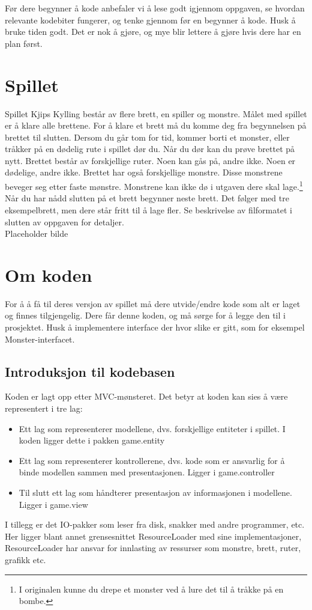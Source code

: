 \documentclass[norsk]{article}
\begin{document}
Før dere begynner å kode anbefaler vi å lese godt igjennom oppgaven, se hvordan relevante kodebiter fungerer, og tenke gjennom før en begynner å kode.
Husk å bruke tiden godt. Det er nok å gjøre, og mye blir lettere å gjøre hvis dere har en plan først. %

\section{Spillet}
\label{sec:spillet}
Spillet Kjips Kylling består av flere brett, en spiller og monstre.
Målet med spillet er å klare alle brettene.
For å klare et brett må du komme deg fra begynnelsen på brettet til slutten.
Dersom du går tom for tid, kommer borti et monster, eller tråkker på en dødelig rute i spillet dør du.
Når du dør kan du prøve brettet på nytt.
Brettet består av forskjellige ruter. Noen kan gås på, andre ikke. Noen er dødelige, andre ikke.
Brettet har også forskjellige monstre. Disse monstrene beveger seg etter faste mønstre. Monstrene kan ikke dø i utgaven dere skal lage.\footnote{I originalen kunne du drepe et monster ved å lure det til å tråkke på en bombe.}
Når du har nådd slutten på et brett begynner neste brett. Det følger med tre eksempelbrett, men dere står fritt til å lage fler.
Se beskrivelse av filformatet i slutten av oppgaven for detaljer.\\
Placeholder bilde \\

\section{Om koden}
\label{sec:om-koden}
For å å få til deres versjon av spillet må dere utvide/endre kode som alt er laget og finnes tilgjengelig.
Dere får denne koden, og må sørge for å legge den til i prosjektet. Husk å implementere interface der hvor slike er gitt, som for eksempel Monster-interfacet.
\subsection{Introduksjon til kodebasen}
\label{subsec:kodebase-intro}
Koden er lagt opp etter MVC-mønsteret. Det betyr at koden kan sies å være representert i tre lag:
\begin{itemize}
\item Ett lag som representerer modellene, dvs. forskjellige entiteter i spillet. I koden ligger dette i pakken game.entity
\item Ett lag som representerer kontrollerene, dvs. kode som er ansvarlig for å binde modellen sammen med presentasjonen. Ligger i game.controller
\item Til slutt ett lag som håndterer presentasjon av informasjonen i modellene. Ligger i game.view
\end{itemize}
I tillegg er det IO-pakker som leser fra disk, snakker med andre programmer, etc.
Her ligger blant annet grensesnittet ResourceLoader med sine implementasjoner, ResourceLoader har ansvar for innlasting av ressurser som monstre, brett, ruter, grafikk etc.
\end{document}
